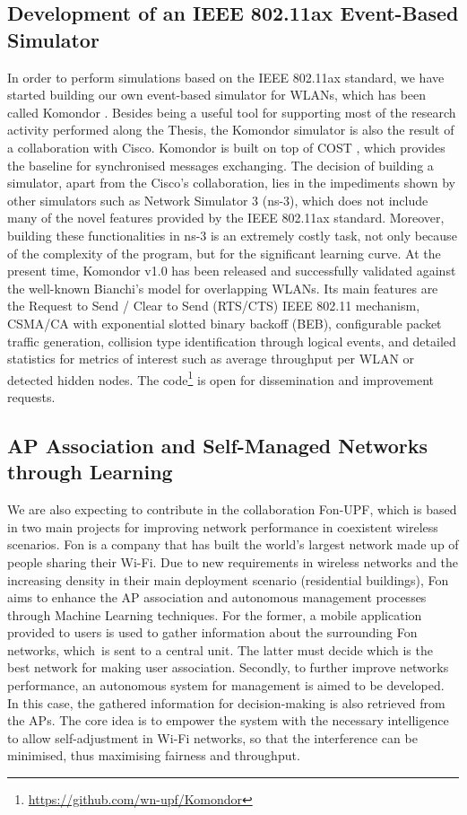 \documentclass[12pt, a4paper,twoside]{tesi_upf}
\begin{document}
			\subsection{Development of an IEEE 802.11ax Event-Based Simulator}
			\label{section:cisco_project}				
				In order to perform simulations based on the IEEE 802.11ax standard, we have started building our own event-based simulator for WLANs, which has been called Komondor \cite{barrachina2017komondor}. Besides being a useful tool for supporting most of the research activity performed along the Thesis, the Komondor simulator is also the result of a collaboration with Cisco. Komondor is built on top of COST \cite{chen2005sense}, which provides the baseline for synchronised messages exchanging. The decision of building a simulator, apart from the Cisco's collaboration, lies in the impediments shown by other simulators such as Network Simulator 3 (ns-3), which does not include many of the novel features provided by the IEEE 802.11ax standard. Moreover, building these functionalities in ns-3 is an extremely costly task, not only because of the complexity of the program, but for the significant learning curve. At the present time, Komondor v1.0 has been released and successfully validated against the well-known Bianchi's model for overlapping WLANs. Its main features are the Request to Send / Clear to Send (RTS/CTS) IEEE 802.11 mechanism, CSMA/CA with exponential slotted binary backoff (BEB), configurable packet traffic generation, collision type identification through logical events, and detailed statistics for metrics of interest such as average throughput per WLAN or detected hidden nodes. The code\footnote{\url{https://github.com/wn-upf/Komondor}} is open for dissemination and improvement requests.
				
			\subsection{AP Association and Self-Managed Networks through Learning}
			\label{section:fon_project}	
				We are also expecting to contribute in the collaboration Fon-UPF, which is based in two main projects for improving network performance in coexistent wireless scenarios. Fon is a company that has built the world's largest network made up of people sharing their Wi-Fi. Due to new requirements in wireless networks and the increasing density in their main deployment scenario (residential buildings), Fon aims to enhance the AP association and autonomous management processes through Machine Learning techniques. For the former, a mobile application provided to users is used to gather information about the surrounding Fon networks, which is sent to a central unit. The latter must decide which is the best network for making user association. Secondly, to further improve networks performance, an autonomous system for management is aimed to be developed. In this case, the gathered information for decision-making is also retrieved from the APs. The core idea is to empower the system with the necessary intelligence to allow self-adjustment in Wi-Fi networks, so that the interference can be minimised, thus maximising fairness and throughput.
			
\end{document}
